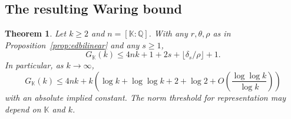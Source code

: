 \documentclass[11pt,letterpaper]{article}
\newtheorem{theorem}{Theorem}[section]
\theoremstyle{definition}
\numberwithin{equation}{section}
\begin{document}
\subsection{The resulting Waring bound}
\begin{theorem}\label{thm:edglobal}
Let $k\ge2$ and $n=[\mathbb K:\mathbb Q]$. With any $r,\theta,\rho$ as
in Proposition~\ref{prop:edbilinear} and any $s\ge1$,
\begin{equation}\label{eq:edfinite}
 G_{\mathbb K}(k)\le 4nk+1+2s+\lfloor\delta_s/\rho\rfloor+1 .
\end{equation}
In particular, as $k\longrightarrow\infty$,
\begin{equation}\label{eq:edglobal}
 G_{\mathbb K}(k)\le 4nk+
 k\left(\log k+\log\log k+2+\log2+
   O\!\left(\frac{\log\log k}{\log k}\right)\right)
\end{equation}
with an absolute implied constant. The norm threshold for
representation may depend on $\mathbb K$ and $k$.
\end{theorem}
\end{document}
